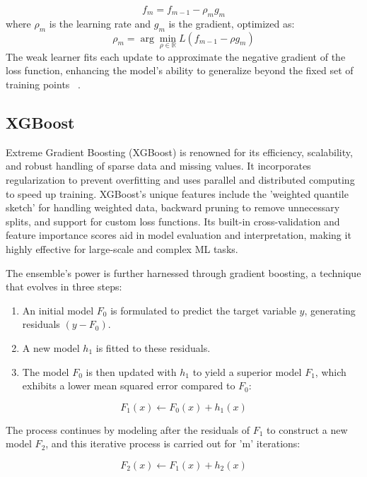 \begin{equation}
f_m = f_{m-1} - \rho_m g_m
\end{equation}
where $\rho_m$ is the learning rate and $g_m$ is the gradient, optimized as:
\begin{equation}
\rho_m = \arg\min_{\rho \in \mathbb{R}} L(f_{m-1} - \rho g_m)
\end{equation}
The weak learner fits each update to approximate the negative gradient of the loss function, enhancing the model's ability to generalize beyond the fixed set of training points ~\cite{murphy2013machine}.

\subsection{XGBoost}

Extreme Gradient Boosting (XGBoost) is renowned for its efficiency, scalability, and robust handling of sparse data and missing values. It incorporates regularization to prevent overfitting and uses parallel and distributed computing to speed up training. XGBoost's unique features include the 'weighted quantile sketch' for handling weighted data, backward pruning to remove unnecessary splits, and support for custom loss functions. Its built-in cross-validation and feature importance scores aid in model evaluation and interpretation, making it highly effective for large-scale and complex ML tasks.

The ensemble's power is further harnessed through gradient boosting, a technique that evolves in three steps:

\begin{enumerate}
    \item An initial model $F_0$ is formulated to predict the target variable $y$, generating residuals $(y - F_0)$.
    \item A new model $h_1$ is fitted to these residuals.
    \item The model $F_0$ is then updated with $h_1$ to yield a superior model $F_1$, which exhibits a lower mean squared error compared to $F_0$:
\end{enumerate}

\[
F_1(x) \leftarrow F_0(x) + h_1(x)
\]

The process continues by modeling after the residuals of $F_1$ to construct a new model $F_2$, and this iterative process is carried out for 'm' iterations:

\[
F_2(x) \leftarrow F_1(x) + h_2(x)
\]

